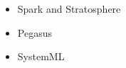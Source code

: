 \documentclass{dima}
\begin{document}
\begin{itemize}
	\item Spark and Stratosphere
	\item Pegasus
	\item SystemML
\end{itemize}







\end{document}
